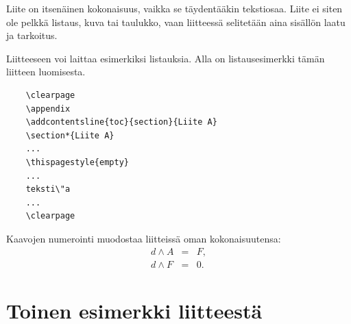 \documentclass[english,12pt,a4paper,pdftex,elec,utf8]{aaltothesis}
\begin{document}
Liite on itsen\"ainen kokonaisuus, vaikka se t\"aydent\"a\"akin tekstiosaa.
Liite ei siten ole pelkk\"a listaus, kuva tai taulukko, vaan
liitteess\"a selitet\"a\"an aina sis\"all\"on laatu ja tarkoitus.

Liitteeseen voi laittaa esimerkiksi listauksia. Alla on
listausesimerkki t\"am\"an liitteen luomisesta.

\begin{verbatim}
	\clearpage
	\appendix
	\addcontentsline{toc}{section}{Liite A}
	\section*{Liite A}
	...
	\thispagestyle{empty}
	...
	teksti\"a
	...
	\clearpage
\end{verbatim}

Kaavojen numerointi muodostaa liitteiss\"a oman kokonaisuutensa:
\begin{eqnarray}
d \wedge A  &=& F, \label{liitekaava1}\\
d \wedge F  &=& 0. \label{liitekaava2}
\end{eqnarray}


\clearpage
\section{Toinen esimerkki liitteest\"a\label{LiiteB}}

\end{document}
